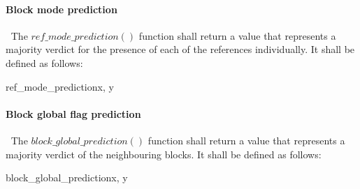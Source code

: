 \paragraph{Block mode prediction}
\label{modeprediction}
$\ $\newline
The $ref\_mode\_prediction()$ function shall return a value that represents a majority
 verdict for the presence of each of the references individually. It shall be defined
 as follows:

\begin{pseudo}{ref\_mode\_prediction}{x, y}
    \bsRET{\Intra}
    \bsRET{\BlockData[0][x-1][\RMode]}
    \bsRET{\BlockData[y-1][0][\RMode]}
\bsELSE
\bsEND
\end{pseudo}

\paragraph{Block global flag prediction}
\label{blockglobalprediction}
$\ $\newline
The $block\_global\_prediction()$ function shall return a value that represents a majority
 verdict of the neighbouring blocks. It shall be defined as follows:

\begin{pseudo}{block\_global\_prediction}{x, y}
    \bsRET{\false}
    \bsRET{\BlockData[0][x-1][\GMode]}
    \bsRET{\BlockData[y-1][0][\GMode]}
\bsELSE
\bsEND
\end{pseudo}

